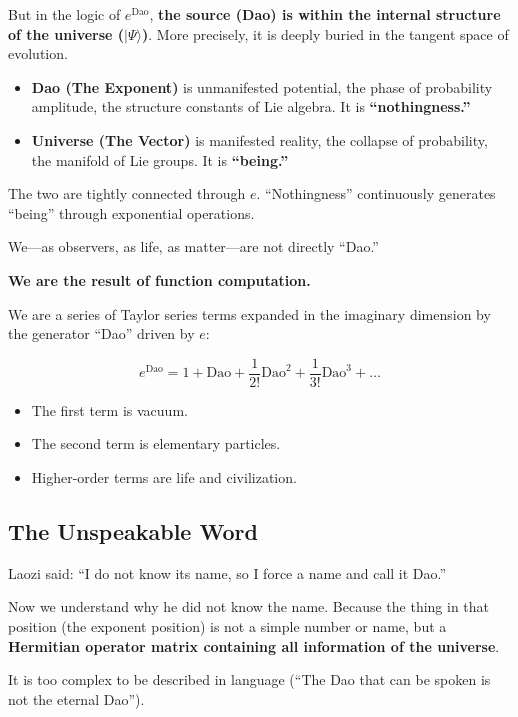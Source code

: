 But in the logic of $e^{\text{Dao}}$, \textbf{the source (Dao) is within the internal structure of the universe ($|\Psi\rangle$)}. More precisely, it is deeply buried in the tangent space of evolution.

\begin{itemize}
\item \textbf{Dao (The Exponent)} is unmanifested potential, the phase of probability amplitude, the structure constants of Lie algebra. It is \textbf{``nothingness.''}

\item \textbf{Universe (The Vector)} is manifested reality, the collapse of probability, the manifold of Lie groups. It is \textbf{``being.''}
\end{itemize}

The two are tightly connected through \textbf{$e$}. ``Nothingness'' continuously generates ``being'' through exponential operations.

We---as observers, as life, as matter---are not directly ``Dao.''

\textbf{We are the result of function computation.}

We are a series of Taylor series terms expanded in the imaginary dimension by the generator ``Dao'' driven by $e$:

$$e^{\text{Dao}} = 1 + \text{Dao} + \frac{1}{2!}\text{Dao}^2 + \frac{1}{3!}\text{Dao}^3 + \dots$$

\begin{itemize}
\item The first term is vacuum.

\item The second term is elementary particles.

\item Higher-order terms are life and civilization.
\end{itemize}

\subsection{The Unspeakable Word}

Laozi said: ``I do not know its name, so I force a name and call it Dao.''

Now we understand why he did not know the name. Because the thing in that position (the exponent position) is not a simple number or name, but a \textbf{Hermitian operator matrix containing all information of the universe}.

It is too complex to be described in language (``The Dao that can be spoken is not the eternal Dao'').

